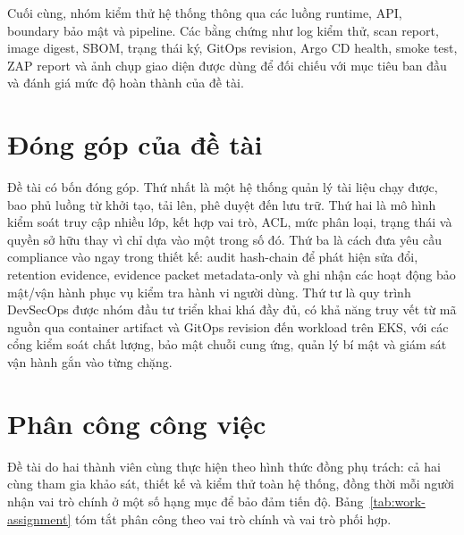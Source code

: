 Cuối cùng, nhóm kiểm thử hệ thống thông qua các luồng runtime, API, boundary bảo mật và pipeline. Các bằng chứng như log kiểm thử, scan report, image digest, SBOM, trạng thái ký, GitOps revision, Argo CD health, smoke test, ZAP report và ảnh chụp giao diện được dùng để đối chiếu với mục tiêu ban đầu và đánh giá mức độ hoàn thành của đề tài.

\section{Đóng góp của đề tài}

Đề tài có bốn đóng góp. Thứ nhất là một hệ thống quản lý tài liệu chạy được, bao phủ luồng từ khởi tạo, tải lên, phê duyệt đến lưu trữ. Thứ hai là mô hình kiểm soát truy cập nhiều lớp, kết hợp vai trò, ACL, mức phân loại, trạng thái và quyền sở hữu thay vì chỉ dựa vào một trong số đó. Thứ ba là cách đưa yêu cầu compliance vào ngay trong thiết kế: audit hash-chain để phát hiện sửa đổi, retention evidence, evidence packet metadata-only và ghi nhận các hoạt động bảo mật/vận hành phục vụ kiểm tra hành vi người dùng. Thứ tư là quy trình DevSecOps được nhóm đầu tư triển khai khá đầy đủ, có khả năng truy vết từ mã nguồn qua container artifact và GitOps revision đến workload trên EKS, với các cổng kiểm soát chất lượng, bảo mật chuỗi cung ứng, quản lý bí mật và giám sát vận hành gắn vào từng chặng.

\section{Phân công công việc}

Đề tài do hai thành viên cùng thực hiện theo hình thức đồng phụ trách: cả hai cùng tham gia khảo sát, thiết kế và kiểm thử toàn hệ thống, đồng thời mỗi người nhận vai trò chính ở một số hạng mục để bảo đảm tiến độ. Bảng~\ref{tab:work-assignment} tóm tắt phân công theo vai trò chính và vai trò phối hợp.

